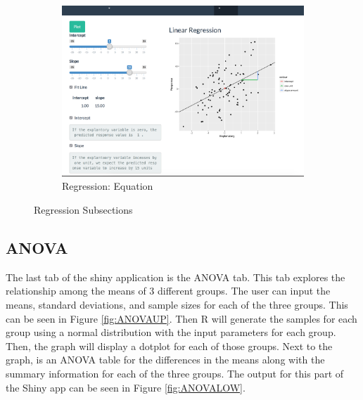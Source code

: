 \documentclass[11pt]{book}
\begin{document}
\begin{figure}
        \begin{subfigure}[b]{0.6\textwidth}
                \includegraphics[width=\textwidth]{LinEq.png}
                \caption{Regression: Equation} 
                \label{fig:LinEq}
        \end{subfigure}
        

\caption {Regression Subsections}
\end{figure}


\subsection{ANOVA}

The last tab of the shiny application is the ANOVA tab.  This tab explores the relationship among the means of 3 different groups.  The user can input the means, standard deviations, and sample sizes for each of the three groups. This can be seen in Figure \ref{fig:ANOVAUP}. Then R will generate the samples for each group using a normal distribution with the input parameters for each group. Then, the graph will display a dotplot for each of those groups.  Next to the graph, is an ANOVA table for the differences in the means along with the summary information for each of the three groups. The output for this part of the Shiny app can be seen in Figure \ref{fig:ANOVALOW}.
\end{document}
